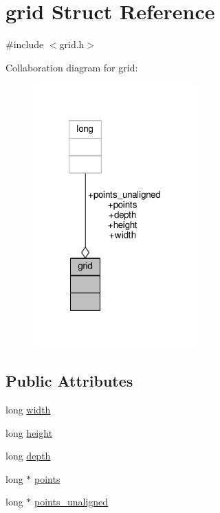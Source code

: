 \hypertarget{structgrid}{\section{grid Struct Reference}
\label{structgrid}
}


{\ttfamily \#include $<$grid.\-h$>$}



Collaboration diagram for grid\-:
\nopagebreak
\begin{figure}[H]
\begin{center}
\leavevmode
\includegraphics[width=179pt]{structgrid__coll__graph}
\end{center}
\end{figure}
\subsection*{Public Attributes}
\begin{DoxyCompactItemize}
\item 
long \hyperlink{structgrid_a0cc93c07249aa37a9453f54f479c0549}{width}
\item 
long \hyperlink{structgrid_a8ac604080756327df4a307c415579b30}{height}
\item 
long \hyperlink{structgrid_a4d2ef93090027bdcd9a94696d9bef170}{depth}
\item 
long $\ast$ \hyperlink{structgrid_aaec1cc6b0a39b6204504d4e0697c86a7}{points}
\item 
long $\ast$ \hyperlink{structgrid_a8cf609c0548a10723073c2c63094dc14}{points\-\_\-unaligned}
\end{DoxyCompactItemize}


